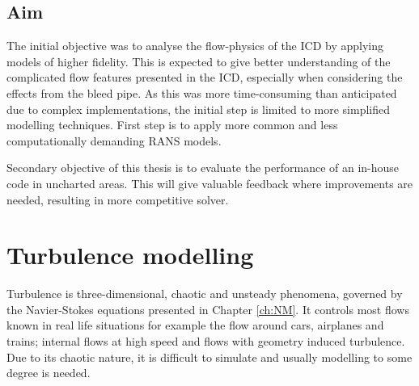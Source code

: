 \section{Aim}
The initial objective was to analyse the flow-physics of the ICD by applying models of higher fidelity. This is expected to give better understanding of the complicated flow features presented in the ICD, especially when considering the effects from the bleed pipe. As this was more time-consuming than anticipated due to complex implementations, the initial step is limited to more simplified modelling techniques. First step is to apply more common and less computationally demanding RANS models.

Secondary objective of this thesis is to evaluate the performance of an in-house code in uncharted areas. This will give valuable feedback where improvements are needed, resulting in more competitive solver.

\chapter{Turbulence modelling\label{ch:Turbulence}}
Turbulence is three-dimensional, chaotic and unsteady phenomena, governed by the Navier-Stokes equations presented in Chapter \ref{ch:NM}. It controls most flows known in real life situations for example the flow around cars, airplanes and trains; internal flows at high speed and flows with geometry induced turbulence. Due to its chaotic nature, it is difficult to simulate and usually modelling to some degree is needed.

